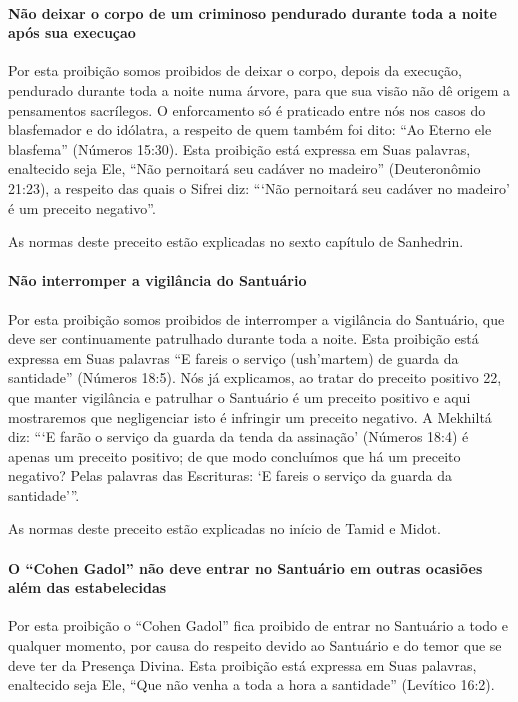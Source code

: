 \paragraph{Não deixar o corpo de um criminoso pendurado durante toda a
noite após sua execuçao}

Por esta proibição somos proibidos de deixar o corpo, depois da
execução, pendurado durante toda a noite numa árvore, para que sua visão
não dê origem a pensamentos sacrílegos. O enforcamento só é praticado
entre nós nos casos do blasfemador e do idólatra, a respeito de quem
também foi dito: ``Ao Eterno ele blasfema'' (Números 15:30). Esta proibição está expressa em Suas palavras, enaltecido seja Ele, ``Não pernoitará seu cadáver no
madeiro'' (Deuteronômio 21:23), a respeito das quais o Sifrei diz:
```Não pernoitará seu cadáver no madeiro' é um preceito negativo''.

As normas deste preceito estão explicadas no sexto capítulo de Sanhedrin.

\paragraph{Não interromper a vigilância do Santuário}

Por esta proibição somos proibidos de interromper a vigilância do
Santuário, que deve ser continuamente patrulhado durante toda a noite.
Esta proibição está expressa em Suas palavras ``E fareis o serviço
(ush'martem) de guarda da santidade'' (Números 18:5). Nós já explicamos,
ao tratar do preceito positivo 22, que manter vigilância e patrulhar o
Santuário é um preceito positivo e aqui mostraremos que negligenciar
isto é infringir um preceito negativo. A Mekhiltá diz: ```E farão o
serviço da guarda da tenda da assinação' (Números 18:4) é apenas um
preceito positivo; de que modo concluímos que há um preceito negativo?
Pelas palavras das Escrituras: `E fareis o serviço da guarda da
santidade'''.

As normas deste preceito estão explicadas no início de Tamid e Midot.

\paragraph{O ``Cohen Gadol'' não deve entrar no Santuário em outras ocasiões além das estabelecidas}

Por esta proibição o ``Cohen Gadol'' fica proibido de entrar no
Santuário a todo e qualquer momento, por causa do respeito devido ao
Santuário e do temor que se deve ter da Presença Divina. Esta proibição
está expressa em Suas palavras, enaltecido seja Ele, ``Que não venha a
toda a hora a santidade'' (Levítico 16:2).

